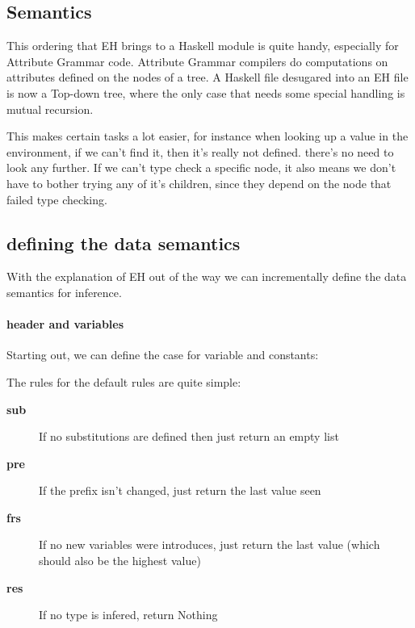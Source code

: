 \subsection{Semantics}

This ordering that EH brings to a Haskell module is quite handy, especially for Attribute Grammar code. Attribute Grammar compilers do computations on attributes defined on the nodes of a tree. A Haskell file desugared into an EH file is now a Top-down tree, where the only case that needs some special handling is mutual recursion. 

This makes certain tasks a lot easier, for instance when looking up a value in the environment, if we can't find it, then it's really not defined. there's no need to look any further. If we can't type check a specific node, it also means we don't have to bother trying any of it's children, since they depend on the node that failed type checking.

\subsection{defining the data semantics}
With the explanation of EH out of the way we can incrementally define the data semantics for inference.

\paragraph{header and variables}
Starting out, we can define the case for variable and constants:

The rules for the default rules are quite simple:
\begin{description}
\item[\textbf{sub}] If no substitutions are defined then just return an empty list
\item[\textbf{pre}] If the prefix isn't changed, just return the last value seen
\item[\textbf{frs}] If no new variables were introduces, just return the last value (which should also be the highest value)
\item[\textbf{res}] If no type is infered, return Nothing
\end{description}

